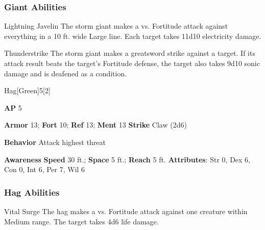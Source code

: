 \subsubsection{Giant Abilities}

\begin{freeability}{Lightning Javelin}
The storm giant makes a  vs. Fortitude attack against everything in a 10 ft. wide Large line.
\hit Each target takes 11d10 electricity damage.
\end{freeability}

\vspace{0.5em}
\begin{freeability}{Thunderstrike}
The storm giant makes a greatsword strike against a target.
If its attack result beats the target's Fortitude defense,
the target also takes 9d10 sonic damage
and is deafened as a condition.
\end{freeability}

\begin{monsection}{Hag}[Green]{5}[2]
\vspace{-1em}\vspace{-1em}
\begin{spellcontent}
\begin{spelltargetinginfo}
{\textbf{AP} 5}

\pari \textbf{Armor} 13;
\textbf{Fort} 10;
\textbf{Ref} 13;
\textbf{Ment} 13
\pari \textbf{Strike} Claw  (2d6)



\pari \textbf{Behavior} Attack highest threat
\end{spelltargetinginfo}
\end{spellcontent}

\begin{monsterfooter}
\pari \textbf{Awareness} 
\pari \textbf{Speed} 30 ft.;
\textbf{Space} 5 ft.;
\textbf{Reach} 5 ft.
\pari \textbf{Attributes}:
Str 0,
Dex 6,
Con 0,
Int 6,
Per 7,
Wil 6
\end{monsterfooter}
\end{monsection}


\subsubsection{Hag Abilities}

\begin{freeability}{Vital Surge}
The hag makes a  vs. Fortitude attack against one creature within Medium range.
\hit The target takes 4d6 life damage.
\end{freeability}

